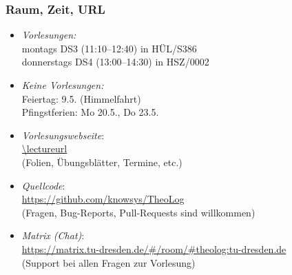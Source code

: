 \documentclass[aspectratio=1610,onlymath]{beamer}
\begin{document}
\maketitle



%
%

\begin{frame}\frametitle{Raum, Zeit, URL}

\begin{itemize}
\item \emph{Vorlesungen:}\\
	montags DS3 (11:10–12:40) in HÜL/S386\\
	donnerstags DS4 (13:00–14:30) in HSZ/0002
\item \emph{Keine Vorlesungen:}\\
	Feiertag: 9.5. (Himmelfahrt)\\
	Pfingstferien: Mo 20.5., Do 23.5.
\item \emph{Vorlesungswebseite}:\\[0.5ex]
	\url{\lectureurl}\\[0.5ex]
	(Folien, Übungsblätter, Termine, etc.)
\item \emph{Quellcode}:\\[0.5ex]
	\url{https://github.com/knowsys/TheoLog}\\[0.5ex]
	(Fragen, Bug-Reports, Pull-Requests sind willkommen)
\item \emph{Matrix (Chat)}:\\[0.5ex]
	\url{https://matrix.tu-dresden.de/\#/room/\#theolog:tu-dresden.de}\\[0.5ex]
	(Support bei allen Fragen zur Vorlesung)
\end{itemize}

\end{frame}
\end{document}
